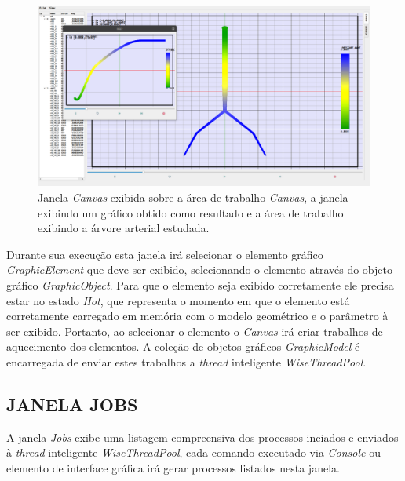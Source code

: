 \begin{figure}[!htbp]
	\centering
	\includegraphics[width=\linewidth]{Figures/IGU_025.png}
	\caption{Janela \textit{Canvas} exibida sobre a área de trabalho \textit{Canvas}, a janela exibindo um gráfico obtido como resultado e a área de trabalho exibindo a árvore arterial estudada.}
	\label{fig:canvas}
\end{figure}

Durante sua execução esta janela irá selecionar o elemento gráfico \textit{GraphicElement} que deve ser exibido, selecionando o elemento através do objeto gráfico \textit{GraphicObject}. Para que o elemento seja exibido corretamente ele precisa estar no estado \textit{Hot}, que representa o momento em que o elemento está corretamente carregado em memória com o modelo geométrico e o parâmetro à ser exibido. Portanto, ao selecionar o elemento o \textit{Canvas} irá criar trabalhos de aquecimento dos elementos. A coleção de objetos gráficos \textit{GraphicModel} é encarregada de enviar estes trabalhos a \textit{thread} inteligente \textit{WiseThreadPool}.

\subsection{JANELA JOBS}\label{sec:janela_jobs}

A janela \textit{Jobs} exibe uma listagem compreensiva dos processos inciados e enviados à \textit{thread} inteligente \textit{WiseThreadPool}, cada comando executado via \textit{Console} ou elemento de interface gráfica irá gerar processos listados nesta janela.

